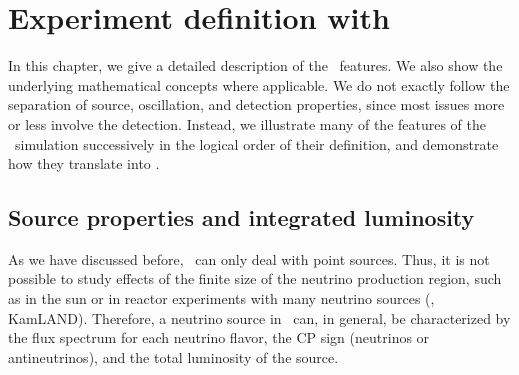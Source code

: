 \chapter{Experiment definition with \AEDL }

In this chapter, we give a detailed description of the \AEDL\ features. We also show the underlying mathematical concepts where applicable. We do not exactly follow the separation of source, oscillation, and detection properties, since most issues more or less involve the detection. Instead,
we illustrate many of the features of the \GLOBES\ simulation successively
in the logical order of their definition, and demonstrate how they translate into \AEDL .

\section{Source properties and integrated luminosity}
\label{sec:source}

As we have discussed before, \GLOBES\ can only deal with point sources. Thus,  it is not possible to study effects of the finite size of the neutrino production region, such as in the sun or in reactor experiments with many
neutrino sources (\eg, KamLAND). Therefore, a neutrino source in \GLOBES\ can, in general, be characterized by the flux spectrum for each neutrino flavor, the CP sign (neutrinos or antineutrinos), and the total luminosity
of the source.

